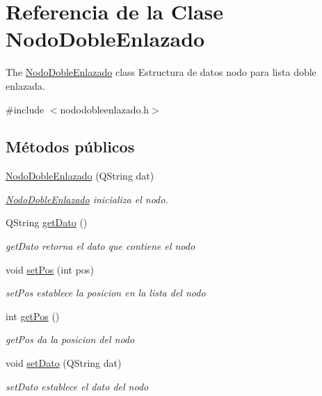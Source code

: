 \hypertarget{class_nodo_doble_enlazado}{}\section{Referencia de la Clase Nodo\+Doble\+Enlazado}
\label{class_nodo_doble_enlazado}


The \mbox{\hyperlink{class_nodo_doble_enlazado}{Nodo\+Doble\+Enlazado}} class Estructura de datos nodo para lista doble enlazada.  




{\ttfamily \#include $<$nododobleenlazado.\+h$>$}

\subsection*{Métodos públicos}
\begin{DoxyCompactItemize}
\item 
\mbox{\hyperlink{class_nodo_doble_enlazado_af8def34f6a5d897ae96434eabfbadd1d}{Nodo\+Doble\+Enlazado}} (Q\+String dat)
\begin{DoxyCompactList}\small\item\em \mbox{\hyperlink{class_nodo_doble_enlazado}{Nodo\+Doble\+Enlazado}} inicializa el nodo. \end{DoxyCompactList}\item 
Q\+String \mbox{\hyperlink{class_nodo_doble_enlazado_a2c464eb4789b8ad28891a308b6f52616}{get\+Dato}} ()
\begin{DoxyCompactList}\small\item\em get\+Dato retorna el dato que contiene el nodo \end{DoxyCompactList}\item 
void \mbox{\hyperlink{class_nodo_doble_enlazado_ae8fa0f3b992875c1031e49eabba670a8}{set\+Pos}} (int pos)
\begin{DoxyCompactList}\small\item\em set\+Pos establece la posicion en la lista del nodo \end{DoxyCompactList}\item 
int \mbox{\hyperlink{class_nodo_doble_enlazado_a73808d8a3ae1ca8094a5e6f0670277ca}{get\+Pos}} ()
\begin{DoxyCompactList}\small\item\em get\+Pos da la posicion del nodo \end{DoxyCompactList}\item 
void \mbox{\hyperlink{class_nodo_doble_enlazado_a7fe3c0a57d300f948bf1228da964a673}{set\+Dato}} (Q\+String dat)
\begin{DoxyCompactList}\small\item\em set\+Dato establece el dato del nodo \end{DoxyCompactList}\end{DoxyCompactItemize}
